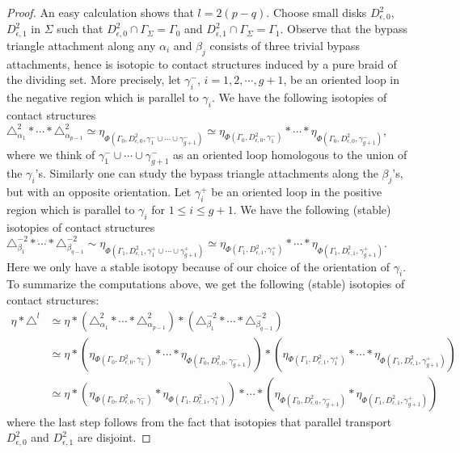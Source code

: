 \documentclass[12pt]{amsart}
\theoremstyle{remark}
\begin{document}
\begin{proof}
An easy calculation shows that $l=2(p-q)$. Choose small disks $D^2_{\epsilon,0}$, $D^2_{\epsilon,1}$ in $\Sigma$ such that $D^2_{\epsilon,0} \cap \Gamma_\Sigma=\Gamma_0$ and $D^2_{\epsilon,1} \cap \Gamma_\Sigma=\Gamma_1$. Observe that the bypass triangle attachment along any $\alpha_i$ and $\beta_j$ consists of three trivial bypass attachments, hence is isotopic to contact structures induced by a pure braid of the dividing set. More precisely, let $\gamma^-_i$, $i=1,2,\cdots,g+1$, be an oriented loop in the negative region which is parallel to $\gamma_i$. We have the following isotopies of contact structures $\triangle_{\alpha_1}^2\ast\cdots\ast\triangle_{\alpha_{p-1}}^2 \simeq \eta_{\Phi(\Gamma_0,D^2_{\epsilon,0},\gamma^-_1\cup\cdots\cup\gamma^-_{g+1})} \simeq \eta_{\Phi(\Gamma_0,D^2_{\epsilon,0},\gamma^-_1)}\ast\cdots\ast\eta_{\Phi(\Gamma_0,D^2_{\epsilon,0},\gamma^-_{g+1})}$, where we think of $\gamma^-_1\cup\cdots\cup\gamma^-_{g+1}$ as an oriented loop homologous to the union of the $\gamma_i$'s. Similarly one can study the bypass triangle attachments along the $\beta_j$'s, but with an opposite orientation. Let $\gamma^+_i$ be an oriented loop in the positive region which is parallel to $\gamma_i$ for $1\leq i\leq g+1$. We have the following (stable) isotopies of contact structures $\triangle_{\beta_1}^{-2}\ast\cdots\ast\triangle_{\beta_{q-1}}^{-2} \sim \eta_{\Phi(\Gamma_1,D^2_{\epsilon,1},\gamma^+_1\cup\cdots\cup\gamma^+_{g+1})} \simeq \eta_{\Phi(\Gamma_1,D^2_{\epsilon,1},\gamma^+_1)}\ast\cdots\ast\eta_{\Phi(\Gamma_1,D^2_{\epsilon,1},\gamma^+_{g+1})}$. Here we only have a stable isotopy because of our choice of the orientation of $\gamma_i$. To summarize the computations above, we get the following (stable) isotopies of contact structures:
\begin{align*}
\eta\ast\triangle^l
&\simeq\eta\ast(\triangle_{\alpha_1}^2\ast\cdots\ast\triangle_{\alpha_{p-1}}^2)\ast(\triangle_{\beta_1}^{-2}\ast\cdots\ast\triangle_{\beta_{q-1}}^{-2}) \\
&\simeq\eta\ast(\eta_{\Phi(\Gamma_0,D^2_{\epsilon,0},\gamma_1^-)}\ast\cdots\ast\eta_{\Phi(\Gamma_0,D^2_{\epsilon,0},\gamma_{g+1}^-)})\ast(\eta_{\Phi(\Gamma_1,D^2_{\epsilon,1},\gamma_1^+)}\ast\cdots\ast\eta_{\Phi(\Gamma_1,D^2_{\epsilon,1},\gamma_{g+1}^+)}) \\
&\simeq\eta\ast(\eta_{\Phi(\Gamma_0,D^2_{\epsilon,0},\gamma_1^-)}\ast\eta_{\Phi(\Gamma_1,D^2_{\epsilon,1},\gamma_1^+)})\ast\cdots\ast(\eta_{\Phi(\Gamma_0,D^2_{\epsilon,0},\gamma_{g+1}^-)}\ast\eta_{\Phi(\Gamma_1,D^2_{\epsilon,1},\gamma_{g+1}^+)})
\end{align*}
where the last step follows from the fact that isotopies that parallel transport $D^2_{\epsilon,0}$ and $D^2_{\epsilon,1}$ are disjoint.


\end{proof}
\end{document}

